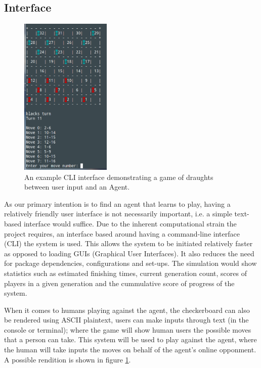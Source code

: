 \documentclass[12pt,a4paper]{article}
\begin{document}
\subsection*{Interface}

    \begin{figure}
        \vspace{-30pt}
        \centering
        \caption{An example CLI interface demonstrating a game of draughts between user input and an Agent. \label{cli_humaninput}}
        \includegraphics[width=43mm]{cli_humanvsagent.png}
        \vspace{-20pt}
    \end{figure}

    As our primary intention is to find an agent that learns to play, having a relatively friendly user interface is not necessarily important, i.e. a simple text-based interface would suffice. Due to the inherent computational strain the project requires, an interface based around having a command-line interface (CLI) the system is used. This allows the system to be initiated relatively faster as opposed to loading GUIs (Graphical User Interfaces). It also reduces the need for package dependencies, configurations and set-ups.  The simulation would show statistics such as estimated finishing times, current generation count, scores of players in a given generation and the cummulative score of progress of the system.

    When it comes to humans playing against the agent, the checkerboard can also be rendered using ASCII plaintext, users can make inputs through text (in the console or terminal); where the game will show human users the possible moves that a person can take. This system will be used to play against the agent, where the human will take inputs the moves on behalf of the agent's online opponment. A possible rendition is shown in figure \ref{cli_humaninput}.
\end{document}
